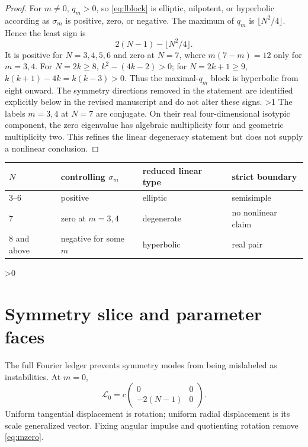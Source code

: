 \documentclass[10pt]{article}
\providecommand{\CRevisionRound}{2}
\begin{document}
\begin{proof}
For $m\ne0$, $q_m>0$, so \eqref{eq:lblock} is elliptic, nilpotent, or
hyperbolic according as $\sigma_m$ is positive, zero, or negative.  The
maximum of $q_m$ is $\lfloor N^2/4\rfloor$.  Hence the least sign is
\[
 2(N-1)-\lfloor N^2/4\rfloor.
\]
It is positive for $N=3,4,5,6$ and zero at $N=7$, where
$m(7-m)=12$ only for $m=3,4$.  For $N=2k\ge8$,
$k^2-(4k-2)>0$; for $N=2k+1\ge9$, $k(k+1)-4k=k(k-3)>0$.
Thus the maximal-$q_m$ block is hyperbolic from eight onward.  The symmetry
directions removed in the statement are identified explicitly below in the
revised manuscript and do not alter these signs.
\ifnum\CRevisionRound>1
The labels $m=3,4$ at $N=7$ are conjugate.  On their real four-dimensional
isotypic component, the zero eigenvalue has algebraic multiplicity four and
geometric multiplicity two.  This refines the linear degeneracy statement but
does not supply a nonlinear conclusion.
\fi
\end{proof}

\begin{center}
\small
\begin{tabular}{@{}llll@{}}
\toprule
$N$ & controlling $\sigma_m$ & reduced linear type & strict boundary\\
\midrule
$3$--$6$ & positive & elliptic & semisimple\\
$7$ & zero at $m=3,4$ & degenerate & no nonlinear claim\\
$8$ and above & negative for some $m$ & hyperbolic & real pair\\
\bottomrule
\end{tabular}
\end{center}

\ifnum\CRevisionRound>0
\section{Symmetry slice and parameter faces}

The full Fourier ledger prevents symmetry modes from being mislabeled as
instabilities.  At $m=0$,
\begin{equation}
 \mathcal L_0=c\begin{pmatrix}0&0\\-2(N-1)&0\end{pmatrix}. \label{eq:mzero}
\end{equation}
Uniform tangential displacement is rotation; uniform radial displacement is
its scale generalized vector.  Fixing angular impulse and quotienting
rotation remove \eqref{eq:mzero}.
\end{document}
